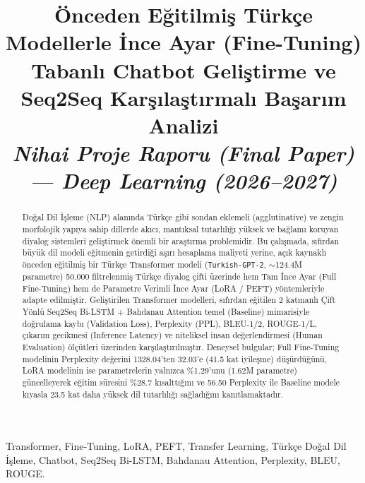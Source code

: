 \documentclass[conference]{IEEEtran}
\begin{document}
\title{Önceden Eğitilmiş Türkçe Modellerle İnce Ayar (Fine-Tuning) Tabanlı Chatbot Geliştirme ve Seq2Seq Karşılaştırmalı Başarım Analizi\\
{\large\textit{Nihai Proje Raporu (Final Paper) --- Deep Learning (2026--2027)}}}

\author{
}

\maketitle

\begin{abstract}
Doğal Dil İşleme (NLP) alanında Türkçe gibi sondan eklemeli (agglutinative) ve zengin morfolojik yapıya sahip dillerde akıcı, mantıksal tutarlılığı yüksek ve bağlamı koruyan diyalog sistemleri geliştirmek önemli bir araştırma problemidir. Bu çalışmada, sıfırdan büyük dil modeli eğitmenin getirdiği aşırı hesaplama maliyeti yerine, açık kaynaklı önceden eğitilmiş bir Türkçe Transformer modeli (\texttt{Turkish-GPT-2}, $\sim$124.4M parametre) 50.000 filtrelenmiş Türkçe diyalog çifti üzerinde hem Tam İnce Ayar (Full Fine-Tuning) hem de Parametre Verimli İnce Ayar (LoRA / PEFT) yöntemleriyle adapte edilmiştir. Geliştirilen Transformer modelleri, sıfırdan eğitilen 2 katmanlı Çift Yönlü Seq2Seq Bi-LSTM + Bahdanau Attention temel (Baseline) mimarisiyle doğrulama kaybı (Validation Loss), Perplexity (PPL), BLEU-1/2, ROUGE-1/L, çıkarım gecikmesi (Inference Latency) ve niteliksel insan değerlendirmesi (Human Evaluation) ölçütleri üzerinden karşılaştırılmıştır. Deneysel bulgular; Full Fine-Tuning modelinin Perplexity değerini 1328.04'ten 32.03'e (41.5 kat iyileşme) düşürdüğünü, LoRA modelinin ise parametrelerin yalnızca \%1.29'unu (1.62M parametre) güncelleyerek eğitim süresini \%28.7 kısalttığını ve 56.50 Perplexity ile Baseline modele kıyasla 23.5 kat daha yüksek dil tutarlılığı sağladığını kanıtlamaktadır.
\end{abstract}

\begin{IEEEkeywords}
Transformer, Fine-Tuning, LoRA, PEFT, Transfer Learning, Türkçe Doğal Dil İşleme, Chatbot, Seq2Seq Bi-LSTM, Bahdanau Attention, Perplexity, BLEU, ROUGE.
\end{IEEEkeywords}
\end{document}
